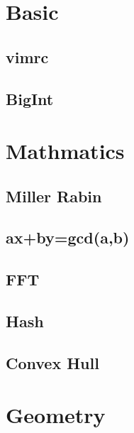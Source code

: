 \documentclass[10pt,twocolumn,oneside]{article}
\begin{document}
\pagestyle{fancy}
\fancyfoot{}
\fancyhead[R]{\thepage}
\renewcommand{\headrulewidth}{0.4pt}
\renewcommand{\contentsname}{Contents}

\scriptsize
\tableofcontents

\newpage

\section{Basic}

\subsection{vimrc}

\subsection{BigInt}



\section{Mathmatics}

\subsection{Miller Rabin}

\subsection{ax+by=gcd(a,b)}

\subsection{FFT}

\subsection{Hash}

\subsection{Convex Hull}




\section{Geometry}
\end{document}
